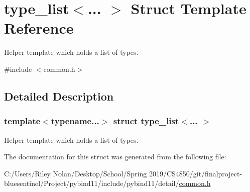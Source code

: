 \hypertarget{structtype__list}{}\section{type\+\_\+list$<$... $>$ Struct Template Reference}
\label{structtype__list}


Helper template which holds a list of types.  




{\ttfamily \#include $<$common.\+h$>$}



\subsection{Detailed Description}
\subsubsection*{template$<$typename...$>$\newline
struct type\+\_\+list$<$... $>$}

Helper template which holds a list of types. 

The documentation for this struct was generated from the following file\+:\begin{DoxyCompactItemize}
\item 
C\+:/\+Users/\+Riley Nolan/\+Desktop/\+School/\+Spring 2019/\+C\+S4850/git/finalproject-\/bluesentinel/\+Project/pybind11/include/pybind11/detail/\mbox{\hyperlink{detail_2common_8h}{common.\+h}}\end{DoxyCompactItemize}
